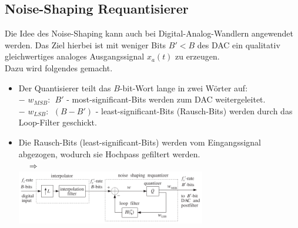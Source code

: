 		\subsection{Noise-Shaping Requantisierer}
			Die Idee des Noise-Shaping kann auch bei Digital-Analog-Wandlern angewendet werden. Das Ziel hierbei ist mit weniger Bits $B'<B$ des DAC ein qualitativ gleichwertiges analoges Ausgangssignal $x_a(t)$ zu erzeugen.\\[0.2cm]
			Dazu wird folgendes gemacht.\\[-0.5cm]
			\begin{itemize}
			 \item Der Quantisierer teilt das $B$-bit-Wort lange in zwei Wörter auf:\\
			 $-$ $w_{MSB}$: $\;B'$ - most-significant-Bits werden zum DAC weitergeleitet.\\
			 $-$ $w_{LSB}$: $\;(B-B')$ - least-significant-Bits (Rausch-Bits) werden durch das Loop-Filter geschickt.
			 \item Die Rausch-Bits (least-significant-Bits) werden vom Eingangssignal abgezogen, wodurch sie Hochpass gefiltert werden.\\[0.2cm]
			 $\quad\Rightarrow\quad$\\[0.2cm]
			 \includegraphics[width = 0.65\textwidth]{pic/requantModel1.pdf}
			\end{itemize}

